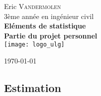 \documentclass[11pt]{report}
\begin{document}
\lstset{language=Matlab}

\pagestyle{fancy}
\lhead{}
\chead{}
\rhead{\thepage}
\lfoot{}
\cfoot{}
\rfoot{}

\begin{titlepage}

\begin{center}

Eric \textsc{Vandermolen} \\[0.3cm]

3ème année en ingénieur civil\\[5.5cm]

{ \Huge \bfseries Eléments de statistique}\\[0.5cm]

{ \huge \bfseries Partie  du projet personnel}\\[4.5cm]

\texttt{[image: logo\_ulg]}

\vfill

{\large \today}

\end{center}

\end{titlepage}

\subsection*{Estimation}
\end{document}
